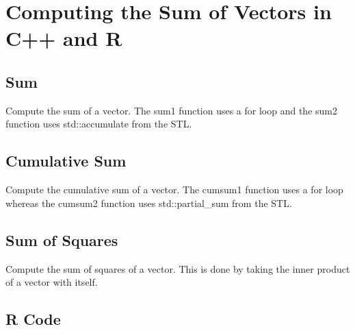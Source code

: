 \chapter{Computing the Sum of Vectors in C++ and R}

\section{Sum}
Compute the sum of a vector.  The sum1 function uses a for loop and the sum2 function uses std::accumulate from the STL.

\lstset{language=C++}


\section{Cumulative Sum}
Compute the cumulative sum of a vector. The cumsum1 function uses a for loop whereas the cumsum2 function uses std::partial\_sum from the STL.

\lstset{language=C++}


\section{Sum of Squares}
Compute the sum of squares of a vector. This is done by taking the inner product of a vector with itself.

\lstset{language=C++}


\section{R Code}

\lstset{language=R}
